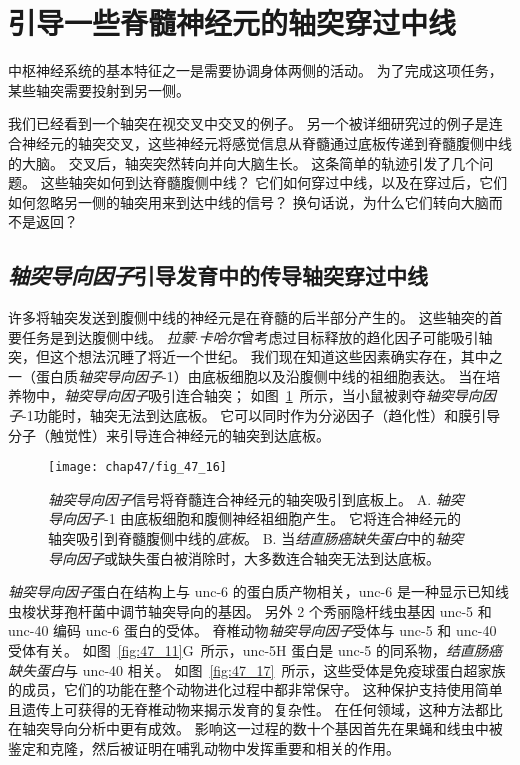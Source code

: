 \section{引导一些脊髓神经元的轴突穿过中线}

中枢神经系统的基本特征之一是需要协调身体两侧的活动。
为了完成这项任务，某些轴突需要投射到另一侧。


我们已经看到一个轴突在视交叉中交叉的例子。
另一个被详细研究过的例子是连合神经元的轴突交叉，这些神经元将感觉信息从脊髓通过底板传递到脊髓腹侧中线的大脑。
交叉后，轴突突然转向并向大脑生长。
这条简单的轨迹引发了几个问题。
这些轴突如何到达脊髓腹侧中线？
它们如何穿过中线，以及在穿过后，它们如何忽略另一侧的轴突用来到达中线的信号？
换句话说，为什么它们转向大脑而不是返回？



\subsection{\textit{轴突导向因子}引导发育中的传导轴突穿过中线}

许多将轴突发送到腹侧中线的神经元是在脊髓的后半部分产生的。
这些轴突的首要任务是到达腹侧中线。
\textit{拉蒙$\cdot$卡哈尔}曾考虑过目标释放的趋化因子可能吸引轴突，但这个想法沉睡了将近一个世纪。
我们现在知道这些因素确实存在，其中之一（蛋白质\textit{轴突导向因子}-1）由底板细胞以及沿腹侧中线的祖细胞表达。
当在培养物中，\textit{轴突导向因子}吸引连合轴突；
如图~\ref{fig:47_16}~所示，当小鼠被剥夺\textit{轴突导向因子}-1功能时，轴突无法到达底板。
它可以同时作为分泌因子（趋化性）和膜引导分子（触觉性）来引导连合神经元的轴突到达底板。


\begin{figure}[htbp]
	\centering
	\texttt{[image: chap47/fig\_47\_16]}
	\caption{\textit{轴突导向因子}信号将脊髓连合神经元的轴突吸引到底板上。
		A. \textit{轴突导向因子}-1 由底板细胞和腹侧神经祖细胞产生。
		它将连合神经元的轴突吸引到脊髓腹侧中线的\textit{底板}。
		B. 当\textit{结直肠癌缺失蛋白}中的\textit{轴突导向因子}或缺失蛋白被消除时，大多数连合轴突无法到达底板。}
	\label{fig:47_16}
\end{figure}


\textit{轴突导向因子}蛋白在结构上与 unc-6 的蛋白质产物相关，unc-6 是一种显示已知线虫梭状芽孢杆菌中调节轴突导向的基因。
另外 2 个秀丽隐杆线虫基因 unc-5 和 unc-40 编码 unc-6 蛋白的受体。
脊椎动物\textit{轴突导向因子}受体与 unc-5 和 unc-40 受体有关。
如图~\ref{fig:47_11}G~所示，unc-5H 蛋白是 unc-5 的同系物，\textit{结直肠癌缺失蛋白}与 unc-40 相关。
如图~\ref{fig:47_17}~所示，这些受体是免疫球蛋白超家族的成员，它们的功能在整个动物进化过程中都非常保守。
这种保护支持使用简单且遗传上可获得的无脊椎动物来揭示发育的复杂性。
在任何领域，这种方法都比在轴突导向分析中更有成效。
影响这一过程的数十个基因首先在果蝇和线虫中被鉴定和克隆，然后被证明在哺乳动物中发挥重要和相关的作用。


